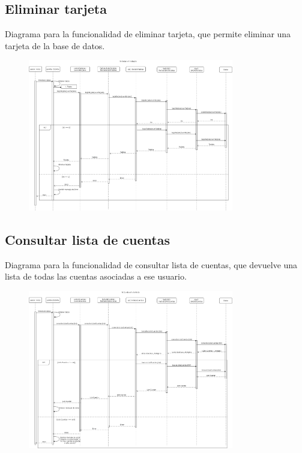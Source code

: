\documentclass[12pt]{article}
\begin{document}
\subsection{Eliminar tarjeta}
Diagrama para la funcionalidad de eliminar tarjeta, que permite eliminar una tarjeta de la base de datos.
\begin{figure}[H]
    \centering
    \includegraphics[width=0.8\textwidth]{images/15-Gestor_elimina_tarjeta.png}
\end{figure}
\subsection{Consultar lista de cuentas}
Diagrama para la funcionalidad de consultar lista de cuentas, que devuelve una lista de todas las cuentas asociadas a ese usuario.
\begin{figure}[H]
    \centering
    \includegraphics[width=0.8\textwidth]{images/16-cuentaconsultartodos.png}
\end{figure}
\end{document}
